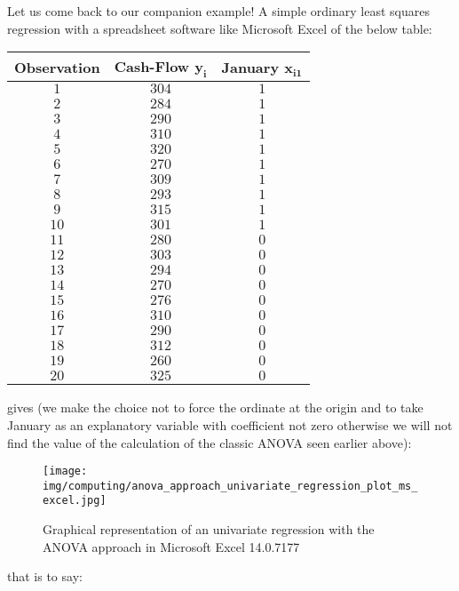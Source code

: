 	Let us come back to our companion example! A simple ordinary least squares regression with a spreadsheet software like Microsoft Excel of the below table:
	\begin{table}[H]
	\centering
			\begin{tabular}{|c|c|c|}
				\hline
				\cellcolor{black!30}\textbf{Observation} & \cellcolor{black!30}\textbf{Cash-Flow $\pmb{y_i}$} & \cellcolor{black!30}\textbf{January $\pmb{x_{i1}}$} \\ \hline
				$1$ & $304$ & $1$\\ \hline
				$2$ & $284$ & $1$ \\ \hline
				$3$ & $290$ & $1$ \\ \hline
				$4$ & $310$ & $1$ \\ \hline
				$5$ & $320$ & $1$ \\ \hline
				$6$ & $270$ & $1$ \\ \hline
				$7$ & $309$ & $1$ \\ \hline
				$8$ & $293$ & $1$ \\ \hline
				$9$ & $315$ & $1$ \\ \hline
				$10$ & $301$ & $1$ \\ \hline
				$11$ & $280$ & $0$ \\ \hline
				$12$ & $303$ & $0$ \\ \hline
				$13$ & $294$ & $0$ \\ \hline
				$14$ & $270$ & $0$ \\ \hline
				$15$ & $276$ & $0$ \\ \hline
				$16$ & $310$ & $0$ \\ \hline
				$17$ & $290$ & $0$ \\ \hline
				$18$ & $312$ & $0$ \\ \hline
				$19$ & $260$ & $0$ \\ \hline
				$20$ & $325$ & $0$ \\ \hline
		\end{tabular}
	\end{table}
	gives (we make the choice not to force the ordinate at the origin and to take January as an explanatory variable with coefficient not zero otherwise we will not find the value of the calculation of the classic ANOVA seen earlier above):
	\begin{figure}[H]
		\centering
		\texttt{[image: img/computing/anova\_approach\_univariate\_regression\_plot\_ms\_excel.jpg]}
		\caption{Graphical representation of an univariate regression with the ANOVA approach in Microsoft Excel 14.0.7177}
	\end{figure}
	that is to say:
	
